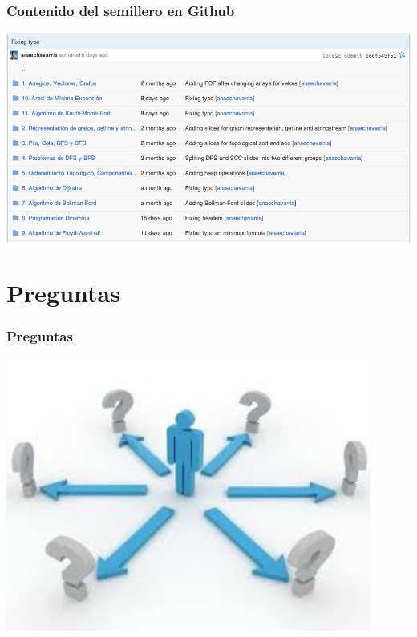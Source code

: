 \documentclass{beamer}
\begin{document}
	\begin{frame}
		\frametitle{Contenido del semillero en Github}
		\includegraphics[width = \textwidth]{Repo.png}
	\end{frame}
	
\section[Preguntas]{Preguntas}
	\begin{frame}
		\frametitle{Preguntas}
		\includegraphics[width = 0.9\textwidth]{preguntas.jpeg}
	\end{frame}
\end{document}
